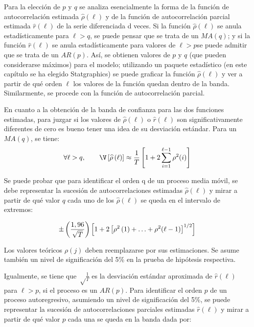 Para la elecci\'{o}n de $p$ y $q$ se analiza esencialmente la forma de la funci\'{o}n de autocorrelaci\'{o}n estimada $\widehat{\rho }(\ell)$ y de la funci\'{o}n de autocorrelaci\'{o}n parcial estimada $\widehat{r}(\ell)$ de la serie diferenciada d veces. Si la funci\'{o}n $\widehat{\rho }(\ell)$ se anula estad\'{i}sticamente para $\ell>q$, se puede pensar que se trata de un $MA(q)$; y si la funci\'{o}n $\widehat{r}(\ell)$ se anula estad\'{i}sticamente para valores de $\ell>p $se puede admitir que se trata de un $AR(p).$ As\'{i}, se obtienen valores de $p$ y $q$ (que pueden considerarse m\'{a}ximos) para el modelo; utilizando un paquete estad\'{i}stico (en este cap\'{i}tulo se ha elegido Statgraphics) se puede graficar la funci\'{o}n $\widehat{\rho }(\ell)$ y ver a partir de qu\'{e} orden $\ell$ los valores de la funci\'{o}n quedan dentro de la banda. Similarmente, se procede con la funci\'{o}n de autocorrelaci\'{o}n parcial.\newline

En cuanto a la obtenci\'{o}n de la banda de confianza para las dos funciones estimadas, para juzgar si los valores de $\widehat{\rho }(\ell)$ o $\widehat{r}(\ell)$ son significativamente diferentes de cero es bueno tener una idea de su desviaci\'{o}n est\'{a}ndar. Para un $MA(q)$, se tiene:
\[
\forall \ell>q,\qquad \V\left[ \widehat{\rho}\left(\ell \right) \right]\approx \frac{1}{T}\left[ 1+2\sum_{i=1}^{\ell-1} {\rho^{2}(i)} \right]
\]

Se puede probar que para identificar el orden q de un proceso media m\'{o}vil, se debe representar la sucesi\'{o}n de autocorrelaciones estimadas $\widehat{\rho }(\ell)$ y mirar a partir de qu\'{e} valor $q$ cada uno de los $\widehat{\rho }(\ell)$ se queda en el intervalo de extremos:

\[
\pm \left( \frac{1,96}{\sqrt T } \right)\left[ 1+2\left[ \rho^{2}\left( 1 \right)+\mathellipsis +\rho^{2}(\ell-1) \right]^{1/2} \right]
\]

Los valores te\'{o}ricos $\rho (j)$ deben reemplazarse por sus estimaciones. Se asume tambi\'{e}n un nivel de significaci\'{o}n del 5{\%} en la prueba de hip\'{o}tesis respectiva.\newline

Igualmente, se tiene que $\sqrt \frac{1}{T} $ es la desviaci\'{o}n est\'{a}ndar aproximada de $\widehat{r}(\ell)$ para $\ell>p$, si el proceso es un $AR(p)$. Para identificar el orden $p$ de un proceso autoregresivo, asumiendo un nivel de significaci\'{o}n del 5{\%}, se puede representar la sucesi\'{o}n de autocorrelaciones parciales estimadas $\widehat{r}(\ell)$ y mirar a partir de qu\'{e} valor $p$ cada una se queda en la banda dada por:

